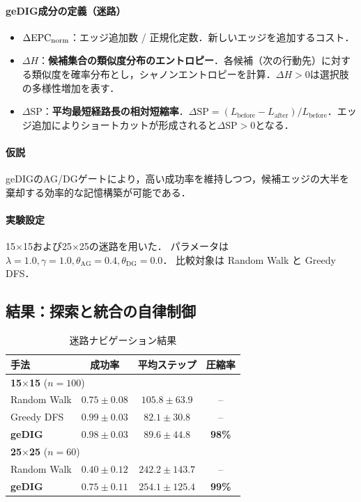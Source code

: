 \paragraph{geDIG成分の定義（迷路）}
\begin{itemize}
\item $\Delta\mathrm{EPC}_{\mathrm{norm}}$：エッジ追加数 / 正規化定数．新しいエッジを追加するコスト．
\item $\Delta H$：\textbf{候補集合の類似度分布のエントロピー}．各候補（次の行動先）に対する類似度を確率分布とし，シャノンエントロピーを計算．$\Delta H > 0$は選択肢の多様性増加を表す．
\item $\Delta \mathrm{SP}$：\textbf{平均最短経路長の相対短縮率}．$\Delta \mathrm{SP} = (L_{\mathrm{before}} - L_{\mathrm{after}}) / L_{\mathrm{before}}$．エッジ追加によりショートカットが形成されると$\Delta \mathrm{SP} > 0$となる．
\end{itemize}

\paragraph{仮説}
geDIGのAG/DGゲートにより，高い成功率を維持しつつ，候補エッジの大半を棄却する効率的な記憶構築が可能である．

\paragraph{実験設定}
15$\times$15および25$\times$25の迷路を用いた．
パラメータは $\lambda=1.0, \gamma=1.0, \theta_{\mathrm{AG}}=0.4, \theta_{\mathrm{DG}}=0.0$．
比較対象は Random Walk と Greedy DFS．

\subsection{結果：探索と統合の自律制御}

\begin{table}[t]
\centering
\caption{迷路ナビゲーション結果}
\label{tab:maze_results}
\small
\begin{tabular}{lccc}
\toprule
手法 & 成功率 & 平均ステップ & 圧縮率 \\
\midrule
\multicolumn{4}{l}{\textbf{15$\times$15} ($n=100$)} \\
Random Walk & $0.75 \pm 0.08$ & $105.8 \pm 63.9$ & -- \\
Greedy DFS & $0.99 \pm 0.03$ & $82.1 \pm 30.8$ & -- \\
\textbf{geDIG} & $\mathbf{0.98 \pm 0.03}$ & $89.6 \pm 44.8$ & \textbf{98\%} \\
\midrule
\multicolumn{4}{l}{\textbf{25$\times$25} ($n=60$)} \\
Random Walk & $0.40 \pm 0.12$ & $242.2 \pm 143.7$ & -- \\
\textbf{geDIG} & $0.75 \pm 0.11$ & $254.1 \pm 125.4$ & \textbf{99\%} \\
\bottomrule
\end{tabular}
\end{table}


